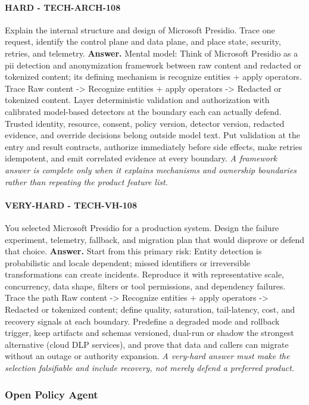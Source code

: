 \paragraph{HARD - TECH-ARCH-108} Explain the internal structure and design of Microsoft Presidio. Trace one request, identify the control plane and data plane, and place state, security, retries, and telemetry.
\textbf{Answer.} Mental model: Think of Microsoft Presidio as a pii detection and anonymization framework between raw content and redacted or tokenized content; its defining mechanism is recognize entities + apply operators. Trace Raw content -> Recognize entities + apply operators -> Redacted or tokenized content. Layer deterministic validation and authorization with calibrated model-based detectors at the boundary each can actually defend. Trusted identity, resource, consent, policy version, detector version, redacted evidence, and override decisions belong outside model text. Put validation at the entry and result contracts, authorize immediately before side effects, make retries idempotent, and emit correlated evidence at every boundary.
\textit{A framework answer is complete only when it explains mechanisms and ownership boundaries rather than repeating the product feature list.}
\paragraph{VERY-HARD - TECH-VH-108} You selected Microsoft Presidio for a production system. Design the failure experiment, telemetry, fallback, and migration plan that would disprove or defend that choice.
\textbf{Answer.} Start from this primary risk: Entity detection is probabilistic and locale dependent; missed identifiers or irreversible transformations can create incidents. Reproduce it with representative scale, concurrency, data shape, filters or tool permissions, and dependency failures. Trace the path Raw content -> Recognize entities + apply operators -> Redacted or tokenized content; define quality, saturation, tail-latency, cost, and recovery signals at each boundary. Predefine a degraded mode and rollback trigger, keep artifacts and schemas versioned, dual-run or shadow the strongest alternative (cloud DLP services), and prove that data and callers can migrate without an outage or authority expansion.
\textit{A very-hard answer must make the selection falsifiable and include recovery, not merely defend a preferred product.}
\subsubsection*{Open Policy Agent}
